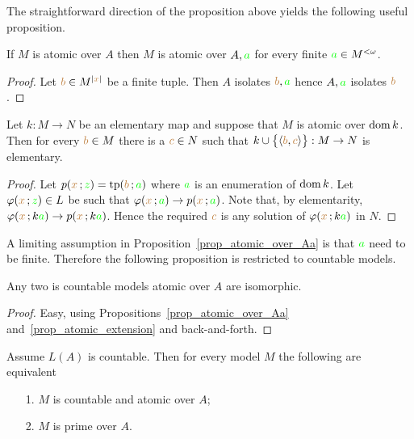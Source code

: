 \documentclass[creche.tex]{subfiles}
\begin{document}
The straightforward direction of the proposition above yields the following useful proposition.

\begin{proposition}\label{prop_atomic_over_Aa}
If $M$ is atomic over $A$ then $M$ is atomic over $A,{\color{green} a}$ for every finite ${\color{green} a}\in M^{<\omega}$.
\end{proposition}
\begin{proof}
Let ${\color{brown} b}\in M^{|{\color{brown} x}|}$ be a finite tuple.
Then $A$ isolates ${\color{brown} b},{\color{green} a}$  hence $A,{\color{green} a}$ isolates ${\color{brown} b}$.
\end{proof}

\begin{proposition}\label{prop_atomic_extension}
Let $k:M\to N$ be an elementary map and suppose that $M$ is atomic over $\mathop{\rm dom} k$.
Then for every ${\color{brown} b}\in M$ there is a ${\color{brown} c}\in N$ such that $k\cup\big\{\langle{\color{brown}b},{\color{brown} c}\rangle\big\}:M\to N$ is elementary.
\end{proposition}

\begin{proof}
Let $p({\color{brown} x}\,;{\color{green} z})={\rm tp}({\color{brown} b}\,;{\color{green} a})$ where ${\color{green} a}$ is an enumeration of $\mathop{\rm dom} k$.
Let $\varphi({\color{brown} x}\,;{\color{green} z})\in L$ be such that $\varphi({\color{brown} x}\,;{\color{green} a})\rightarrow p({\color{brown} x}\,;{\color{green} a})$.
Note that, by elementarity, $\varphi({\color{brown} x}\,;k{\color{green} a})\rightarrow p({\color{brown} x}\,;k{\color{green} a})$.
Hence the required ${\color{brown} c}$ is any solution of $\varphi({\color{brown} x}\,;k{\color{green} a})$ in $N$.
\end{proof}

A limiting assumption in Proposition~\ref{prop_atomic_over_Aa} is that ${\color{green} a}$ need to be finite.
Therefore the following proposition is restricted to countable models.

\begin{proposition}\label{prop_atomic_unique}
Any two is countable models atomic over $A$ are isomorphic.
\end{proposition}

\begin{proof}
Easy, using Propositions~\ref{prop_atomic_over_Aa} and~\ref{prop_atomic_extension} and back-and-forth.
\end{proof}

\begin{proposition} 
Assume $L(A)$ is countable.
Then for every model $M$ the following are equivalent
\begin{itemize}
\item[1.] $M$ is countable and atomic over $A$;
\item[2.] $M$ is prime over $A$.
\end{itemize}
\end{proposition}
\end{document}
